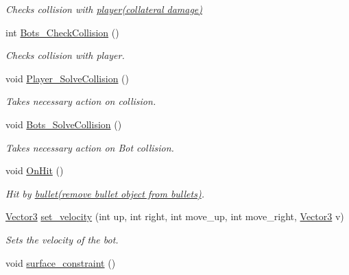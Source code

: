 \begin{DoxyCompactItemize}
\begin{DoxyCompactList}\small\item\em Checks collision with \hyperlink{classplayer}{player(collateral damage)} \end{DoxyCompactList}\item 
int \hyperlink{classbots_af3310df339a45ab9afc51237f23ff2ef}{Bots\+\_\+\+Check\+Collision} ()
\begin{DoxyCompactList}\small\item\em Checks collision with player. \end{DoxyCompactList}\item 
\hypertarget{classbots_a2a28f79d12e59cc519e8f3a5a01ac7c1}{void \hyperlink{classbots_a2a28f79d12e59cc519e8f3a5a01ac7c1}{Player\+\_\+\+Solve\+Collision} ()}\label{classbots_a2a28f79d12e59cc519e8f3a5a01ac7c1}

\begin{DoxyCompactList}\small\item\em Takes necessary action on collision. \end{DoxyCompactList}\item 
\hypertarget{classbots_a2e87752c651117ed23a941cd577170be}{void \hyperlink{classbots_a2e87752c651117ed23a941cd577170be}{Bots\+\_\+\+Solve\+Collision} ()}\label{classbots_a2e87752c651117ed23a941cd577170be}

\begin{DoxyCompactList}\small\item\em Takes necessary action on Bot collision. \end{DoxyCompactList}\item 
\hypertarget{classbots_a4030cac6ad70f3505f88b0a0971a5cdf}{void \hyperlink{classbots_a4030cac6ad70f3505f88b0a0971a5cdf}{On\+Hit} ()}\label{classbots_a4030cac6ad70f3505f88b0a0971a5cdf}

\begin{DoxyCompactList}\small\item\em Hit by \hyperlink{classbullet}{bullet(remove bullet object from bullets)}. \end{DoxyCompactList}\item 
\hyperlink{class_vector3}{Vector3} \hyperlink{classbots_aa0084ed6b2648d3ff4c0da10ecb24b83}{set\+\_\+velocity} (int up, int right, int move\+\_\+up, int move\+\_\+right, \hyperlink{class_vector3}{Vector3} v)
\begin{DoxyCompactList}\small\item\em Sets the velocity of the bot. \end{DoxyCompactList}\item 
\hypertarget{classbots_a1232690e5224c0606eb188caea7a2b1c}{void \hyperlink{classbots_a1232690e5224c0606eb188caea7a2b1c}{surface\+\_\+constraint} ()}\label{classbots_a1232690e5224c0606eb188caea7a2b1c}


\end{DoxyCompactItemize}
